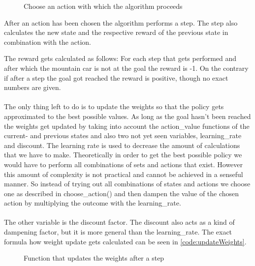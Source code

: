 \documentclass{article}
\begin{document}
	\begin{figure}
		\caption{Choose an action with which the algorithm proceeds}
		\label{code:chooseAction}
		
	\end{figure}
	\newpage
	
	
	\noindent After an action has been chosen the algorithm performs a step. 
	The step also calculates the new state and the respective reward of the previous state in combination with the action.
	
	
	
	
	
	The reward gets calculated as follows: For each step that gets performed and after which the mountain car is not at the goal the reward is -1. On the contrary if after a step the goal got reached the reward is positive, though no exact numbers are given. \\
	\\
	The only thing left to do is to update the weights so that the policy gets approximated to the best possible values. As long as the goal hasn't been reached the weights get updated by taking into account the action\_value functions of the current- and previous states and also two not yet seen variables, learning\_rate and discount. The learning rate is used to decrease the amount of calculations that we have to make. Theoretically in order to get the best possible policy we would have to perform all combinations of sets and actions that exist. However this amount of complexity is not practical and cannot be achieved in a senseful manner. So instead of trying out all combinations of states and actions we choose one as described in choose\_action() and then dampen the value of the chosen action by multiplying the outcome with the learning\_rate. \\
	\\
	The other variable is the discount factor. The discount also acts as a kind of dampening factor, but it is more general than the learning\_rate. The exact formula how weight update gets calculated can be seen in \autoref{code:updateWeights}. 
	
	\begin{figure}[h]
		\caption{Function that updates the weights after a step}
		\label{code:updateWeights}
		
	\end{figure}
	
\end{document}
